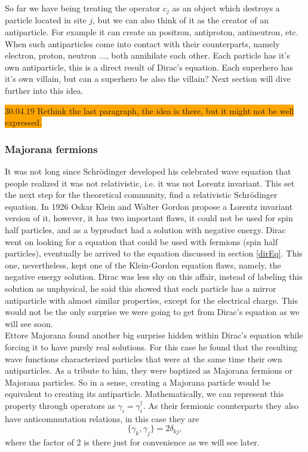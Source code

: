 So far we have being treating the operator $c_j$ as an object which destroys a particle located in site $j$, but we can also think of it as the creator of an antiparticle. For example it can create an positron, antiproton, antineutron, etc. When such antiparticles come into contact with their counterparts, namely electron, proton, neutron ..., both annihilate each other. Each particle has it's own antiparticle, this is a direct result of Dirac's equation. Each superhero has it's own villain, but can a superhero be also the villain? Next section will dive further into this idea.

\colorbox{orange}{30.04.19 Rethink the last paragraph, the idea is there, but it might not be well expressed.}

\subsubsection{Majorana fermions}

It was not long since Schrödinger developed his celebrated wave equation that people realized it was not relativistic, i.e. it was not Lorentz invariant. This set the next step for the theoretical community, find a relativistic Schrödinger equation. In 1926 Oskar Klein and Walter Gordon propose a Lorentz invariant version of it, however, it has two important flaws, it could not be used for spin half particles, and as a byproduct had a solution with negative energy\cite{antimatter}. Dirac went on looking for a equation that could be used with fermions (spin half particles), eventually he arrived to the equation discussed in section \ref{dirEq}. This one, nevertheless, kept one of the Klein-Gordon equation flaws, namely, the negative energy solution. Dirac was less shy on this affair, instead of labeling this solution as unphysical, he said this showed that each particle has a mirror antiparticle with almost similar properties, except for the electrical charge. This would not be the only surprise we were going to get from Dirac's equation as we will see soon.\\


Ettore Majorana found another big surprise hidden within Dirac's equation while forcing it to have purely real solutions. For this case he found that the resulting wave functions characterized particles that were at the same time their own antiparticles. As a tribute to him, they were baptized as Majorana fermions or Majorana particles. So in a sense, creating a Majorana particle would be equivalent to creating its antiparticle. Mathematically, we can represent this property through operators as $\gamma_i = \gamma_i^\dagger$. As their fermionic counterparts they also have anticommutation relations, in this case they are 
\begin{equation}
    \{\gamma_k,\gamma_j\} = 2\delta_{kj},
    \label{anticomm}
\end{equation}
where the factor of 2 is there just for convenience as we will see later.\\


